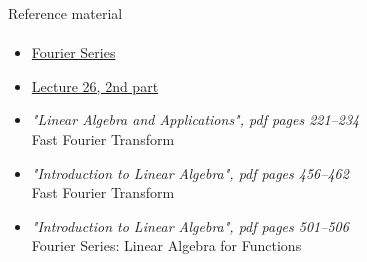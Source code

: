 \documentclass[aspectratio=169]{beamer}
\newcommand{\fbckg}[1]{\usebackgroundtemplate{\texttt{[image: \#1]}}}%
\begin{document}
\begin{frame}[t]{Reference material}
    \framesubtitle{}
    \Large
    \begin{itemize}
        \item \href{https://youtu.be/vA9dfINW4Rg}{Fourier Series}
        \item \href{https://www.youtube.com/watch?v=Y_Ac6KiQ1t0&list=PL49CF3715CB9EF31D&index=27}{Lecture 26, 2nd part}
        \item \textit{"Linear Algebra and Applications", pdf pages 221--234 }\\ Fast Fourier Transform
        \item \textit{"Introduction to Linear Algebra", pdf pages 456--462 }\\ Fast Fourier Transform
        \item  \textit{"Introduction to Linear Algebra", pdf pages 501--506 }\\ Fourier Series:  Linear Algebra for Functions 
    \end{itemize}
\end{frame}

\fbckg{fibeamer/figs/last_page.png}
\frame[plain]{}
\end{document}
